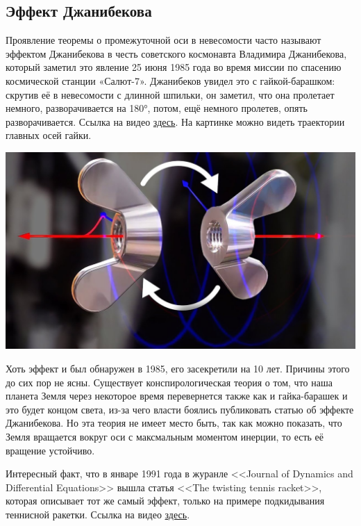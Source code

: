 \documentclass{article}
\begin{document}
\subsection{Эффект Джанибекова}
Проявление теоремы о промежуточной оси в невесомости часто называют эффектом Джанибекова в честь советского космонавта Владимира Джанибекова, который заметил это явление 25 июня 1985 года во время миссии по спасению космической станции «Салют-7». Джанибеков увидел это с гайкой-барашком: скрутив её в невесомости с длинной шпильки, он заметил, что она пролетает немного, разворачивается на 180°, потом, ещё немного пролетев, опять разворачивается. Ссылка на видео \href{https://drive.google.com/file/d/1BzamAH0nOhmOP-1huOhpGuFn74Gylbex/view?usp=sharing}{здесь}. На картинке можно видеть траектории главных осей гайки.
\begin{center}
\includegraphics[width=0.4\linewidth]{Jannibekov.jpg}
\end{center}
\par
Хоть эффект и был обнаружен в 1985, его засекретили на 10 лет. Причины этого до сих пор не ясны. Существует конспирологическая теория о том, что наша планета Земля через некоторое время перевернется также как и гайка-барашек и это будет концом света, из-за чего власти боялись публиковать статью об эффекте Джанибекова.  Но эта теория не имеет место быть, так как можно показать, что Земля вращается вокруг оси с максмальным моментом инерции, то есть её вращение устойчиво.
\par
Интересный факт, что в январе 1991 года в журанле <<Journal of Dynamics and Differential Equations>> вышла статья <<The twisting tennis racket>>, которая описывает тот же самый эффект, только на примере подкидывания теннисной ракетки. Ссылка на видео \href{https://drive.google.com/file/d/1E3dLOBM_y7htk1nGw3SlNdhqiH9wUY-F/view?usp=sharing}{здесь}.
\end{document}

